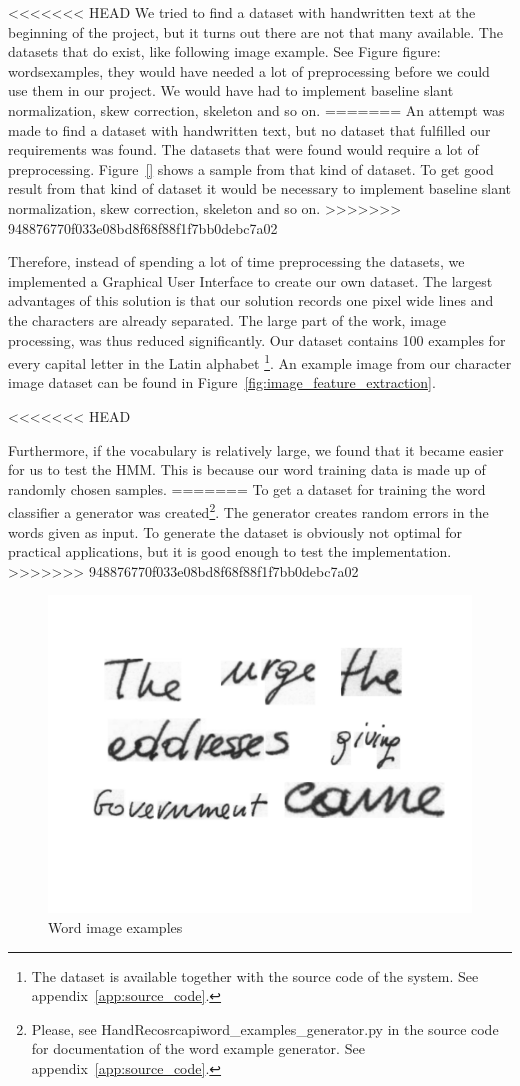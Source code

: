 
<<<<<<< HEAD
We tried to find a dataset with handwritten text at the beginning of the project, but it turns out there are not that many available. 
The datasets that do exist, like following image example. See Figure {figure: wordsexamples}, they would have needed a lot of preprocessing before we could use them in our project.
We would have had to implement baseline slant normalization, skew correction, skeleton and so on.
=======
An attempt was made to find a dataset with handwritten text, but no dataset that fulfilled our requirements was found.
The datasets that were found would require a lot of preprocessing. 
Figure~\ref{} shows a sample from that kind of dataset.
To get good result from that kind of dataset it would be necessary to implement baseline slant normalization, skew correction, skeleton and so on.
>>>>>>> 948876770f033e08bd8f68f88f1f7bb0debc7a02

Therefore, instead of spending a lot of time preprocessing the datasets, we implemented a Graphical User Interface to create our own dataset.
The largest advantages of this solution is that our solution records one pixel wide lines and the characters are already separated. 
The large part of the work, image processing, was thus reduced significantly.
Our dataset contains 100 examples for every capital letter in the Latin alphabet
\footnote{The dataset is available together with the source code of the system. See appendix~\ref{app:source_code}.}.
An example image from our character image dataset can be found in Figure~\ref{fig:image_feature_extraction}.

<<<<<<< HEAD


Furthermore, if the vocabulary is relatively large, we found that it became easier for us to test the HMM.
This is because our word training data is made up of randomly chosen samples.
=======
To get a dataset for training the word classifier a generator was created\footnote{Please, see HandReco\/src\/api\/word\_examples\_generator.py in the source code for documentation of the word example generator. See appendix~\ref{app:source_code}.}.
The generator creates random errors in the words given as input.
To generate the dataset is obviously not optimal for practical applications, but it is good enough to test the implementation.
>>>>>>> 948876770f033e08bd8f68f88f1f7bb0debc7a02

\begin{figure}[h!]
  \centering
  \includegraphics[width=5in]{datasets_examples}
  \caption{Word image examples}
  \label{figure:wordsexamples}
\end{figure}
